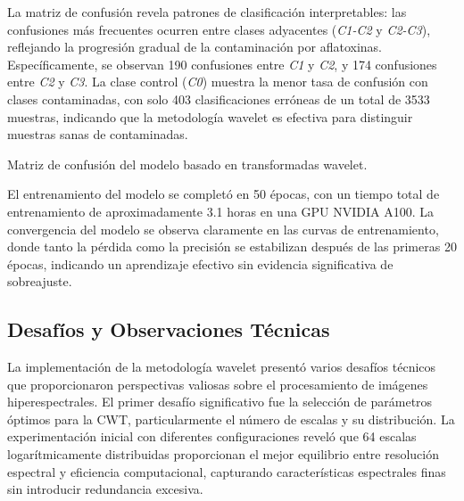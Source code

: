 \vspace{5mm}

La matriz de confusión revela patrones de clasificación interpretables: las confusiones más frecuentes ocurren entre clases adyacentes (\emph{C1-C2} y \emph{C2-C3}), reflejando la progresión gradual de la contaminación por aflatoxinas. Específicamente, se observan 190 confusiones entre \emph{C1} y \emph{C2}, y 174 confusiones entre \emph{C2} y \emph{C3}. La clase control (\emph{C0}) muestra la menor tasa de confusión con clases contaminadas, con solo 403 clasificaciones erróneas de un total de 3533 muestras, indicando que la metodología wavelet es efectiva para distinguir muestras sanas de contaminadas.

\begin{table}[ht]
\centering
\caption{Matriz de confusión del modelo basado en transformadas wavelet.}
\label{tab:wavelet_confusion_matrix}
\end{table}

\vspace{5mm}

El entrenamiento del modelo se completó en 50 épocas, con un tiempo total de entrenamiento de aproximadamente 3.1 horas en una GPU NVIDIA A100. La convergencia del modelo se observa claramente en las curvas de entrenamiento, donde tanto la pérdida como la precisión se estabilizan después de las primeras 20 épocas, indicando un aprendizaje efectivo sin evidencia significativa de sobreajuste.

\subsection{Desafíos y Observaciones Técnicas}

La implementación de la metodología wavelet presentó varios desafíos técnicos que proporcionaron perspectivas valiosas sobre el procesamiento de imágenes hiperespectrales. El primer desafío significativo fue la selección de parámetros óptimos para la CWT, particularmente el número de escalas y su distribución. La experimentación inicial con diferentes configuraciones reveló que 64 escalas logarítmicamente distribuidas proporcionan el mejor equilibrio entre resolución espectral y eficiencia computacional, capturando características espectrales finas sin introducir redundancia excesiva.

\vspace{5mm}

